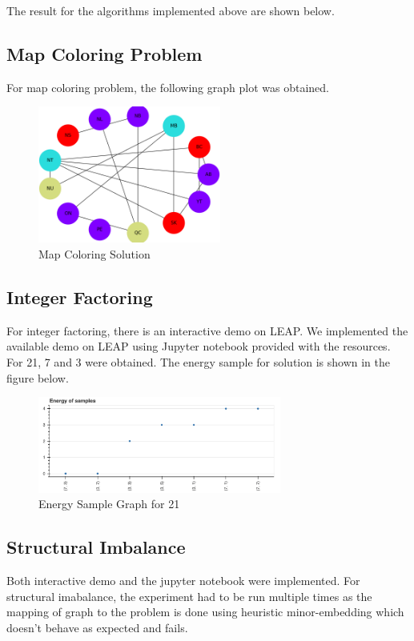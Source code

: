 \documentclass[12pt,conference]{IEEEtran}
\begin{document}
The result for the algorithms implemented above are shown below. 

\subsection{Map Coloring Problem}

For map coloring problem, the following graph plot was obtained.
\begin{figure}[h]
  \centering
  \includegraphics[width=6cm]{map_coloring.png}
  \caption{Map Coloring Solution}
  \label{fig:MCS}
\end{figure}

\subsection{Integer Factoring}
For integer factoring, there is an interactive demo on LEAP. We implemented the available demo on LEAP using Jupyter notebook provided with the resources. For 21, 7 and 3 were obtained. The energy sample for solution is shown in the figure below.

\begin{figure}[h]
  \centering
  \includegraphics[width=8cm]{esg.png}
  \caption{Energy Sample Graph for 21}
  \label{fig:ESG}
\end{figure}

\subsection{Structural Imbalance}
Both interactive demo and the jupyter notebook were implemented.
For structural imabalance, the experiment had to be run multiple times as the mapping of graph to the problem is done using heuristic minor-embedding which doesn't behave as expected and fails. 
\end{document}
